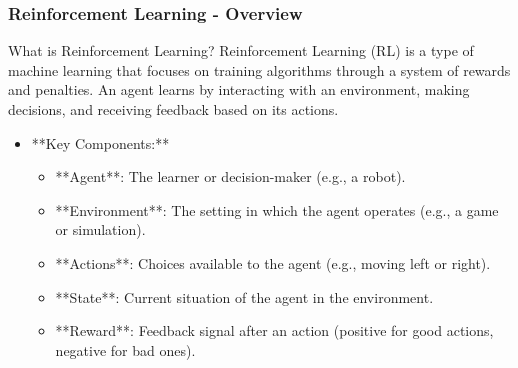 \documentclass[aspectratio=169]{beamer}
\begin{document}
\begin{frame}[fragile]
    \frametitle{Reinforcement Learning - Overview}

    \begin{block}{What is Reinforcement Learning?}
        Reinforcement Learning (RL) is a type of machine learning that focuses on training algorithms 
        through a system of rewards and penalties. An agent learns by interacting with an environment, 
        making decisions, and receiving feedback based on its actions.
    \end{block}
    
    \begin{itemize}
        \item **Key Components:**
            \begin{itemize}
                \item **Agent**: The learner or decision-maker (e.g., a robot).
                \item **Environment**: The setting in which the agent operates (e.g., a game or simulation).
                \item **Actions**: Choices available to the agent (e.g., moving left or right).
                \item **State**: Current situation of the agent in the environment.
                \item **Reward**: Feedback signal after an action (positive for good actions, negative for bad ones).
            \end{itemize}
    \end{itemize}
\end{frame}
\end{document}
